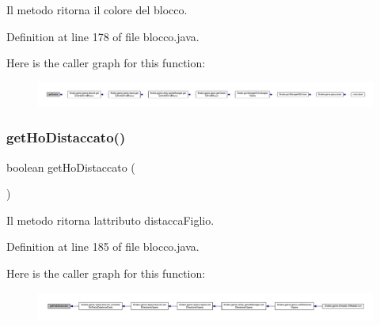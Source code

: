 Il metodo ritorna il colore del blocco. 



Definition at line 178 of file blocco.\+java.

Here is the caller graph for this function\+:
\nopagebreak
\begin{figure}[H]
\begin{center}
\leavevmode
\includegraphics[width=350pt]{class_snake_1_1game_1_1vipera_1_1blocco_ae3f520a7be49ba6d662a1504fbe4acf3_icgraph}
\end{center}
\end{figure}
\mbox{\label{class_snake_1_1game_1_1vipera_1_1blocco_a09b5923541116b960ee0c349c60b92fe}} 
\subsubsection{\texorpdfstring{get\+Ho\+Distaccato()}{getHoDistaccato()}}
{\footnotesize\ttfamily boolean get\+Ho\+Distaccato (\begin{DoxyParamCaption}{ }\end{DoxyParamCaption})}



Il metodo ritorna l\textquotesingle{}attributo distacca\+Figlio. 



Definition at line 185 of file blocco.\+java.

Here is the caller graph for this function\+:
\nopagebreak
\begin{figure}[H]
\begin{center}
\leavevmode
\includegraphics[width=350pt]{class_snake_1_1game_1_1vipera_1_1blocco_a09b5923541116b960ee0c349c60b92fe_icgraph}
\end{center}
\end{figure}
\mbox{\label{class_snake_1_1game_1_1vipera_1_1blocco_a95fdd903a87a54ceaba0674eee0a4dda}} 
